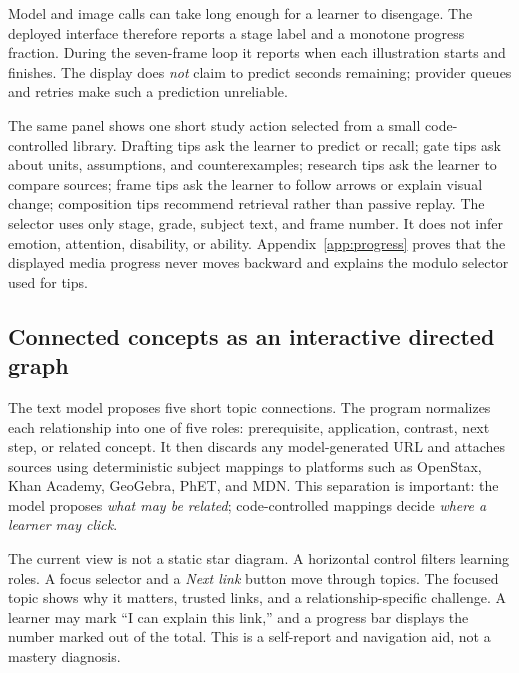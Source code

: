 \documentclass[11pt]{article}
\theoremstyle{plain}
\theoremstyle{definition}
\begin{document}
Model and image calls can take long enough for a learner to disengage. The deployed interface therefore reports a stage label and a monotone progress fraction. During the seven-frame loop it reports when each illustration starts and finishes. The display does \emph{not} claim to predict seconds remaining; provider queues and retries make such a prediction unreliable.

The same panel shows one short study action selected from a small code-controlled library. Drafting tips ask the learner to predict or recall; gate tips ask about units, assumptions, and counterexamples; research tips ask the learner to compare sources; frame tips ask the learner to follow arrows or explain visual change; composition tips recommend retrieval rather than passive replay. The selector uses only stage, grade, subject text, and frame number. It does not infer emotion, attention, disability, or ability. Appendix~\ref{app:progress} proves that the displayed media progress never moves backward and explains the modulo selector used for tips.

\subsection{Connected concepts as an interactive directed graph}

The text model proposes five short topic connections. The program normalizes each relationship into one of five roles: prerequisite, application, contrast, next step, or related concept. It then discards any model-generated URL and attaches sources using deterministic subject mappings to platforms such as OpenStax, Khan Academy, GeoGebra, PhET, and MDN. This separation is important: the model proposes \emph{what may be related}; code-controlled mappings decide \emph{where a learner may click}.

The current view is not a static star diagram. A horizontal control filters learning roles. A focus selector and a \emph{Next link} button move through topics. The focused topic shows why it matters, trusted links, and a relationship-specific challenge. A learner may mark ``I can explain this link,'' and a progress bar displays the number marked out of the total. This is a self-report and navigation aid, not a mastery diagnosis.
\end{document}
